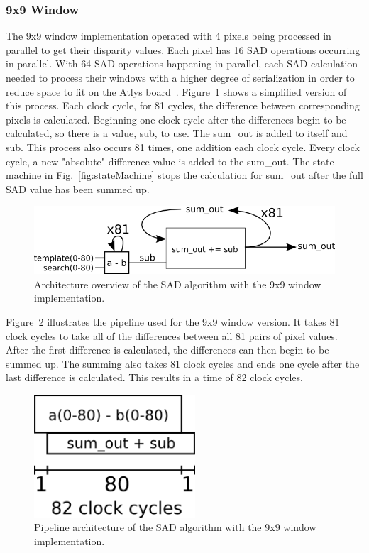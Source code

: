 \subsubsection{9x9 Window}
\label{sec:9x9window}

The 9x9 window implementation operated with 4 pixels being processed in parallel to get their disparity values. Each pixel has 16 SAD operations occurring in parallel. With 64 SAD operations happening in parallel, each SAD calculation needed to process their windows with a higher degree of serialization in order to reduce space to fit on the Atlys board~\cite{atlysBoard}. Figure~\ref{fig:sadAlg9x9} shows a simplified version of this process. Each clock cycle, for 81 cycles, the difference between corresponding pixels is calculated. Beginning one clock cycle after the differences begin to be calculated, so there is a value, sub, to use. The sum\_out is added to itself and sub. This process also occurs 81 times, one addition each clock cycle. Every clock cycle, a new "absolute" difference value is added to the sum\_out. The state machine in Fig.~\ref{fig:stateMachine} stops the calculation for sum\_out after the full SAD value has been summed up.

\begin{figure}[h]
	\begin{center}
		\includegraphics[width=120mm]{figures/sadAlgorithm9x9.png}
		\captionfonts
		\caption{Architecture overview of the SAD algorithm with the 9x9 window implementation.}
		\label{fig:sadAlg9x9}
	\end{center}
\end{figure}

Figure~\ref{fig:sadPipe9x9} illustrates the pipeline used for the 9x9 window version. It takes 81 clock cycles to take all of the differences between all 81 pairs of pixel values. After the first difference is calculated, the differences can then begin to be summed up. The summing also takes 81 clock cycles and ends one cycle after the last difference is calculated. This results in a time of 82 clock cycles.

\begin{figure}[h]
	\begin{center}
		\includegraphics[width=60mm]{figures/sadPipeline9x9.png}
		\captionfonts
		\caption{Pipeline architecture of the SAD algorithm with the 9x9 window implementation.}
		\label{fig:sadPipe9x9}
	\end{center}
\end{figure}

